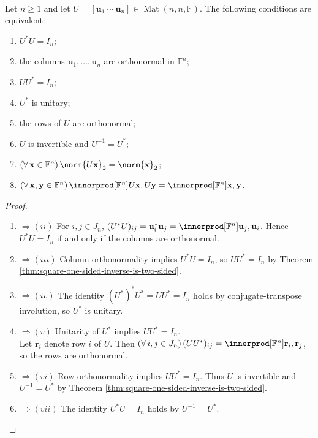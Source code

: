 \begin{theorem} \label{thm:unitary-matrix-equivalent-conditions} \\
Let $n\geq1$ and let $U=[\mathbf{u}_1\ \cdots\ \mathbf{u}_n]\in\operatorname{Mat}(n,n,\mathbb{F})$. The following conditions are equivalent:
\begin{enumerate}[label=(\roman*)]
\setlength{\itemsep}{0pt}
\item $U^*U=I_n$;
\item the columns $\mathbf{u}_1,\ldots,\mathbf{u}_n$ are orthonormal in $\mathbb{F}^n$;
\item $UU^*=I_n$;
\item $U^*$ is unitary;
\item the rows of $U$ are orthonormal;
\item $U$ is invertible and $U^{-1}=U^*$;
\item $(\forall\,\mathbf{x}\in\mathbb{F}^n)\,\norm{U\mathbf{x}}_2=\norm{\mathbf{x}}_2$;
\item $(\forall\,\mathbf{x},\mathbf{y}\in\mathbb{F}^n)\,\innerprod[\mathbb{F}^n]{U\mathbf{x},U\mathbf{y}}=\innerprod[\mathbb{F}^n]{\mathbf{x},\mathbf{y}}$.
\end{enumerate}
\begin{proof}
\begin{enumerate}[label=(\roman*)]
\setlength{\itemsep}{0pt}
\item[$(i)$] $\Rightarrow (ii)$ For $i,j\in J_n$, $(U^*U)_{ij}=\mathbf{u}_i^*\mathbf{u}_j=\innerprod[\mathbb{F}^n]{\mathbf{u}_j,\mathbf{u}_i}$. Hence $U^*U=I_n$ if and only if the columns are orthonormal.
\item[$(ii)$] $\Rightarrow (iii)$ Column orthonormality implies $U^*U=I_n$, so $UU^*=I_n$ by Theorem \ref{thm:square-one-sided-inverse-is-two-sided}.
\item[$(iii)$] $\Rightarrow (iv)$ The identity $(U^*)^*U^*=UU^*=I_n$ holds by conjugate-transpose involution, so $U^*$ is unitary.
\item[$(iv)$] $\Rightarrow (v)$ Unitarity of $U^*$ implies $UU^*=I_n$.\\
Let $\mathbf{r}_i$ denote row $i$ of $U$. Then $(\forall\,i,j\in J_n)\,(UU^*)_{ij}=\innerprod[\mathbb{F}^n]{\mathbf{r}_i,\mathbf{r}_j}$, so the rows are orthonormal.
\item[$(v)$] $\Rightarrow (vi)$ Row orthonormality implies $UU^*=I_n$. Thus $U$ is invertible and $U^{-1}=U^*$ by Theorem \ref{thm:square-one-sided-inverse-is-two-sided}.
\item[$(vi)$] $\Rightarrow (vii)$ The identity $U^*U=I_n$ holds by $U^{-1}=U^*$.\\

\end{enumerate}
\end{proof}
\end{theorem}
